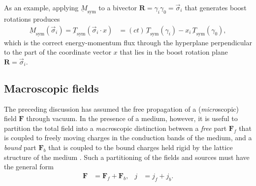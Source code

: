 \documentclass[1p,sort&compress]{elsarticle}
\numberwithin{equation}{section}
\newcommand{\rv}[1]{\vec{#1}}
\newcommand{\bv}[1]{\mathbf{#1}}
\begin{document}
As an example, applying $\underbar{M}_{\text{sym}}$ to a bivector $\bv{R}=\gamma_i\gamma_0 = \rv{\sigma}_i$ that generates boost rotations produces
\begin{align}
\underbar{M}_{\text{sym}}(\rv{\sigma}_i) = \underbar{T}_{\text{sym}}(\rv{\sigma}_i\cdot x) &= (ct)\,\underbar{T}_{\text{sym}}(\gamma_i) - x_i\,\underbar{T}_{\text{sym}}(\gamma_0), 
\end{align}
which is the correct energy-momentum flux through the hyperplane perpendicular to the part of the coordinate vector $x$ that lies in the boost rotation plane $\bv{R}=\rv{\sigma}_i$.


\subsection{Macroscopic fields}


The preceding discussion has assumed the free propagation of a (\emph{micro}scopic) field $\bv{F}$ through vacuum.  In the presence of a medium, however, it is useful to partition the total field into a \emph{macro}scopic distinction between a \emph{free} part $\bv{F}_f$ that is coupled to freely moving charges in the conduction bands of the medium, and a \emph{bound} part $\bv{F}_b$ that is coupled to the bound charges held rigid by the lattice structure of the medium \cite{Jackson1999,Landau1984}.  Such a partitioning of the fields and sources must have the general form
\begin{align}\label{eq:macroscopicsplit}
  \bv{F} &= \bv{F}_f + \bv{F}_b, & j &= j_f + j_b.
\end{align}
\end{document}
